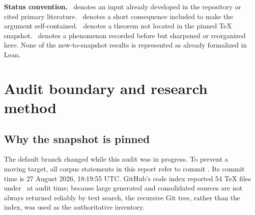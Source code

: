 \documentclass[11pt]{article}
\numberwithin{equation}{section}
\theoremstyle{definition}
\theoremstyle{remark}
\newcommand{\Up}{\operatorname{up}}
\begin{document}
\begin{abstract}
Claims marked \NewResult\ mean only that no counterpart was found in the frozen
TeX corpus after targeted collision searches.  They are proved here, but no claim
of worldwide historical priority is made.  In particular, Rvachev's 1977 paper
on approximation by $\Up$ and the broader Russian-language atomic-function
literature require a separate priority audit.
\end{abstract}

\begin{boxedremark}
\textbf{Status convention.}
\Corpus\ denotes an input already developed in the repository or cited primary
literature.  \Derived\ denotes a short consequence included to make the argument
self-contained.  \NewResult\ denotes a theorem not located in the pinned TeX
snapshot.  \Observed\ denotes a phenomenon recorded before but sharpened or
reorganized here.  None of the new-to-snapshot results is represented as already
formalized in Lean.
\end{boxedremark}


\newpage

\section{Audit boundary and research method}
\label{p2:sec:audit}

\subsection{Why the snapshot is pinned}

The default branch changed while this audit was in progress.  To prevent a moving
target, all corpus statements in this report refer to commit \commit.  Its commit
time is 27 August 2026, 18:19:55 UTC.  GitHub's code index reported 54 TeX files
under \repo\ at audit time; because large generated and consolidated sources are
not always returned reliably by text search, the recursive Git tree, rather than
the index, was used as the authoritative inventory.
\end{document}

